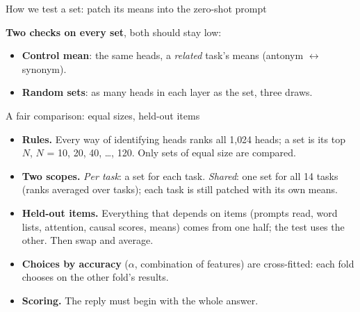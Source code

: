 \documentclass[aspectratio=169,11pt,xcolor=table]{beamer}
\newcommand{\spaced}{\setlength{\itemsep}{0.55em}}
\newcommand{\nl}{\textbackslash n}
\begin{document}
\begin{frame}{How we test a set: patch its means into the zero-shot prompt}
\centering
{}

\vspace{0.7em}
\raggedright
\textbf{Two checks on every set}, both should stay low:
\begin{itemize}
\item \textbf{Control mean}: the same heads, a \emph{related} task's means (antonym $\leftrightarrow$ synonym).
\item \textbf{Random sets}: as many heads in each layer as the set, three draws.
\end{itemize}
\end{frame}

\begin{frame}{A fair comparison: equal sizes, held-out items}
\begin{itemize}\spaced
\item \textbf{Rules.} Every way of identifying heads ranks all 1{,}024 heads; a set is its top $N$,
      $N$ = 10, 20, 40, \dots, 120. Only sets of equal size are compared.
\item \textbf{Two scopes.} \emph{Per task}: a set for each task.
      \emph{Shared}: one set for all 14 tasks (ranks averaged over tasks);
      each task is still patched with its own means.
\item \textbf{Held-out items.} Everything that depends on items (prompts read, word lists, attention,
      causal scores, means) comes from one half; the test uses the other. Then swap and average.
\item \textbf{Choices by accuracy} ($\alpha$, combination of features) are cross-fitted:
      each fold chooses on the other fold's results.
\item \textbf{Scoring.} The reply must begin with the whole answer.
\end{itemize}
\end{frame}
\end{document}
